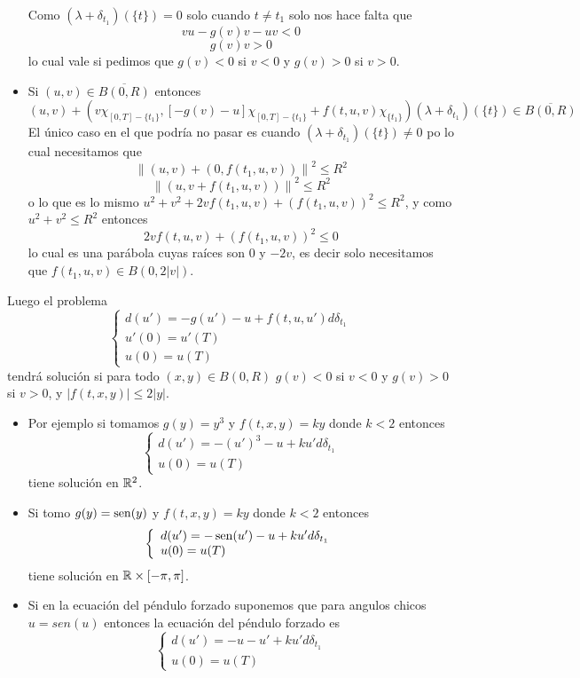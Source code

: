 \begin{example}
\begin{itemize}
	Como $(\lambda+\delta_{t_1})(\{t\})=0$ solo cuando $t\neq t_1$ solo nos hace falta que 
	$$vu-g(v)v- uv <0$$ 
	$$g(v)v>0$$
	lo cual vale si pedimos que $g(v)<0$ si $v<0$ y $g(v)>0$ si $v>0$.
	
	
	\item Si $(u,v)\in\overline{ B(0,R)}$ entonces
	$$(u,v)+\left(v\chi_{[0,T]-\{t_1\}}, \left[ -g(v)-u\right] \chi_{[0,T]-\{t_1\}} +f(t,u,v)\chi_{\{t_1\}}\right) (\lambda+\delta_{t_1})(\{t\})\in \overline{ B(0,R)}$$
	El único caso en el que podría no pasar es cuando $(\lambda+\delta_{t_1})(\{t\})\neq 0$ po lo cual necesitamos que
	$$\left\| (u,v)+(0,f(t_1,u,v))\right\|^2\leq R^2 $$
		$$\left\| (u,v+f(t_1,u,v))\right\|^2\leq R^2 $$
	o lo que es lo mismo	$u^2+v^2+2vf(t_1,u,v)+(f(t_1,u,v))^2\leq R^2$, y como $u^2+v^2\leq R^2$ entonces
	$$2vf(t,u,v)+(f(t_1,u,v))^2\leq 0$$
	lo cual es una parábola cuyas raíces son $0$ y $-2v$, es decir solo necesitamos que $f(t_1,u,v)\in B(0,2|v|)$.
\end{itemize}
Luego el problema 
\begin{equation*}
	\left\lbrace \begin{array}{l}
		d(u')=-g(u')- u+f(t,u,u')d\delta_{t_1}\\
		u'(0)=u'(T)\\
		u(0)=u(T)
	\end{array}\right. 
\end{equation*} 
tendrá solución si para todo $(x,y)\in B(0,R)$ $g(v)<0$ si $v<0$ y $g(v)>0$ si $v>0$, y $|f(t,x,y)|\leq 2|y|$. 
 \begin{itemize}
 	\item  Por ejemplo si tomamos $g(y)=y^3$ y $f(t,x,y)=ky$ donde $k<2$ entonces 
\begin{equation*}
	\left\lbrace \begin{array}{l}
		d(u')=-(u')^3- u+ku' d\delta_{t_1}\\
		u(0)=u(T)
	\end{array}\right. 
\end{equation*} 
tiene solución en $ \mathbb{R}^2$.

\item  Si tomo $g(y)=\operatorname*{sen}(y)$ y $f(t,x,y)=ky$  donde $k<2$ entonces
\begin{equation*}
	\left\lbrace \begin{array}{l}
		d(u')=-\operatorname*{sen}(u')- u+ku' d\delta_{t_1}\\
		u(0)=u(T)
	\end{array}\right. 
\end{equation*} 
tiene solución en $ \mathbb{R}\times [-\pi,\pi]$.
\item Si en la ecuación del péndulo forzado suponemos que para angulos chicos $u = sen(u)$ entonces la ecuación del péndulo forzado es 
\begin{equation*}
	\left\lbrace \begin{array}{l}
		d(u')=-u-u'+ku' d\delta_{t_1}\\
		u(0)=u(T)
	\end{array}\right. 
\end{equation*} 

\end{itemize}
 \end{example}